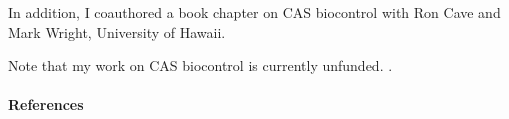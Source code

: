 \begin{refsection}
In addition, I coauthored a book chapter on CAS biocontrol with Ron Cave and Mark Wright, University of Hawaii.

Note that my work on CAS biocontrol is currently unfunded. \cite{cave_biological_2022}.

\paragraph{References}
\printbibliography[heading=none]

\end{refsection}

